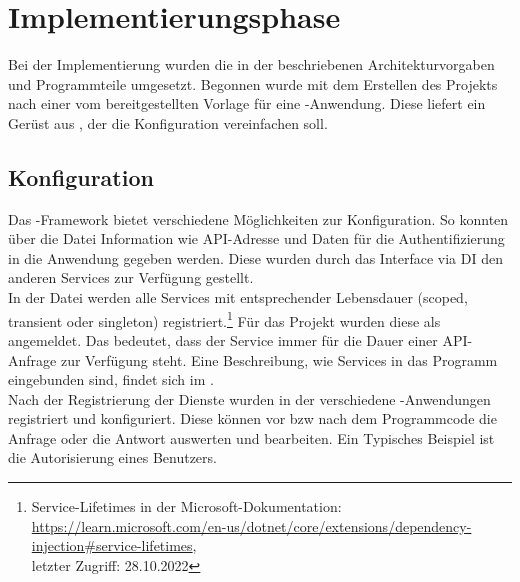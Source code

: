 \section{Implementierungsphase} 
\label{sec:Implementierungsphase}
Bei der Implementierung wurden die in der  beschriebenen Architekturvorgaben
und Programmteile umgesetzt. Begonnen wurde mit dem Erstellen des Projekts nach einer vom 
bereitgestellten Vorlage für eine -Anwendung. Diese liefert ein Gerüst aus
, der \zB die Konfiguration vereinfachen soll.

\subsection{Konfiguration}
\label{sec:Konfiguration}
Das -Framework bietet verschiedene Möglichkeiten zur Konfiguration.
So konnten über die Datei  Information wie \acs{API}-Adresse und Daten für die
Authentifizierung in die Anwendung gegeben werden. Diese wurden durch das Interface 
via \acs{DI} den anderen Services zur Verfügung gestellt. \\
In der Datei  werden alle Services mit entsprechender Lebensdauer (scoped, transient oder singleton)
registriert.\footnote{Service-Lifetimes in der Microsoft-Dokumentation:\\
\url{https://learn.microsoft.com/en-us/dotnet/core/extensions/dependency-injection\#service-lifetimes},\\
letzter Zugriff: 28.10.2022}
Für das Projekt wurden diese als  angemeldet. Das bedeutet, dass der Service immer für die Dauer einer
\acs{API}-Anfrage zur Verfügung steht. Eine Beschreibung, wie Services in das Programm eingebunden sind, findet sich im 
.\\
Nach der Registrierung der Dienste wurden in der  verschiedene -Anwendungen 
registriert und konfiguriert. Diese können vor \acs{bzw} nach dem Programmcode die Anfrage oder die Antwort auswerten 
und bearbeiten. Ein Typisches Beispiel ist die Autorisierung eines Benutzers.

